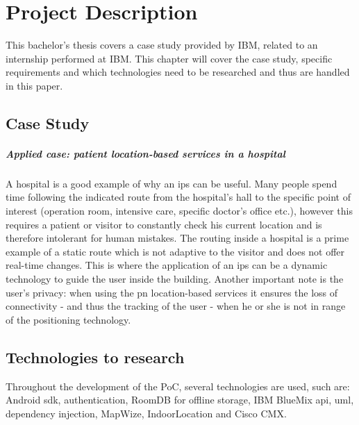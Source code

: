 \section{Project Description}
This bachelor's thesis covers a case study provided by IBM, related to an internship performed at IBM. This chapter will cover the case study, specific requirements and which technologies need to be researched and thus are handled in this paper.
\subsection{Case Study}
\subparagraph{Applied case: patient location-based services in a hospital}
A hospital is a good example of why an \acrshort{ips} can be useful. Many people spend time following the indicated route from the hospital's hall to the specific point of interest (operation room, intensive care, specific doctor's office etc.), however this requires a patient or visitor to constantly check his current location and is therefore intolerant for human mistakes. The routing inside a hospital is a prime example of a static route which is not adaptive to the visitor and does not offer real-time changes. This is where the application of an \acrshort{ips} can be a dynamic technology to guide the user inside the building. Another important note is the user's privacy: when using the \acrshort{pn} location-based services it ensures the loss of connectivity - and thus the tracking of the user - when he or she is not in range of the positioning technology.
\subsection{Technologies to research}
Throughout the development of the PoC, several technologies are used, such are: Android \acrshort{sdk}, authentication, RoomDB for offline storage, IBM BlueMix \acrshort{api}, \acrfull{uml}, dependency injection, MapWize, IndoorLocation and Cisco CMX.